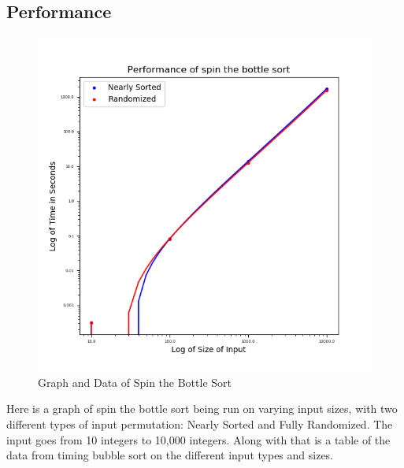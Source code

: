 \documentclass{article}
\begin{document}
\subsection{Performance}
    \begin{figure}[H]
        \centering
        \includegraphics[scale=0.60]{"../images/spin-the-bottle"}
        \caption{Graph and Data of Spin the Bottle Sort}
    \end{figure}
    Here is a graph of spin the bottle sort being run on varying input sizes, 
    with two different types of input permutation: Nearly Sorted and Fully 
    Randomized. The input goes from 10 integers to 10,000 integers. Along with 
    that is a table of the data from timing bubble sort on the different input 
    types and sizes.
\end{document}
